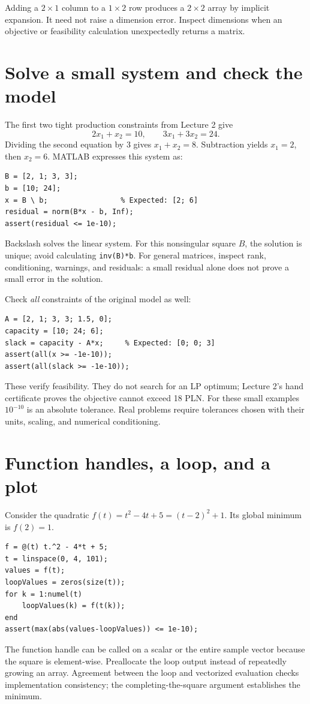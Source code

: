 \documentclass[11pt,a4paper]{article}
\begin{document}
\begin{remark}
  Adding a $2\times1$ column to a $1\times2$ row produces a $2\times2$ array by
  implicit expansion. It need not raise a dimension error. Inspect dimensions when
  an objective or feasibility calculation unexpectedly returns a matrix.
\end{remark}

\section{Solve a small system and check the model}\label{sec:solve}
The first two tight production constraints from Lecture 2 give
\[
  2x_1+x_2=10,\qquad 3x_1+3x_2=24.
\]
Dividing the second equation by 3 gives $x_1+x_2=8$. Subtraction yields $x_1=2$,
then $x_2=6$. MATLAB expresses this system as:
\begin{lstlisting}
B = [2, 1; 3, 3];
b = [10; 24];
x = B \ b;                 % Expected: [2; 6]
residual = norm(B*x - b, Inf);
assert(residual <= 1e-10);
\end{lstlisting}
Backslash solves the linear system. For this nonsingular square $B$, the solution
is unique; avoid calculating \texttt{inv(B)*b}. For general matrices, inspect rank,
conditioning, warnings, and residuals: a small residual alone does not prove a
small error in the solution.

Check \emph{all} constraints of the original model as well:
\begin{lstlisting}
A = [2, 1; 3, 3; 1.5, 0];
capacity = [10; 24; 6];
slack = capacity - A*x;     % Expected: [0; 0; 3]
assert(all(x >= -1e-10));
assert(all(slack >= -1e-10));
\end{lstlisting}
These verify feasibility. They do not search for an LP optimum; Lecture 2's
hand certificate proves the objective cannot exceed 18 PLN.
For these small examples $10^{-10}$ is an absolute tolerance. Real problems
require tolerances chosen with their units, scaling, and numerical conditioning.

\section{Function handles, a loop, and a plot}\label{sec:functions}
Consider the quadratic
$f(t)=t^2-4t+5=(t-2)^2+1$. Its global minimum is $f(2)=1$.
\begin{lstlisting}
f = @(t) t.^2 - 4*t + 5;
t = linspace(0, 4, 101);
values = f(t);
loopValues = zeros(size(t));
for k = 1:numel(t)
    loopValues(k) = f(t(k));
end
assert(max(abs(values-loopValues)) <= 1e-10);
\end{lstlisting}
The function handle can be called on a scalar or the entire sample vector because
the square is element-wise. Preallocate the loop output instead of repeatedly
growing an array. Agreement between the loop and vectorized evaluation checks
implementation consistency; the completing-the-square argument establishes the minimum.
\end{document}
